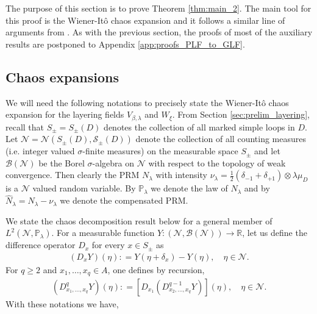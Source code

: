 \documentclass[a4paper, 11pt, reqno]{amsart}
\theoremstyle{definition} \newtheorem{defn}{Definition}[section]
\theoremstyle{remark} \newtheorem{rem}[defn]{Remark}
\theoremstyle{remark} \newtheorem*{rem*}{Remark}
\theoremstyle{plain} \newtheorem{thm}[defn]{Theorem}
\theoremstyle{plain} \newtheorem{lem}[defn]{Lemma}
\theoremstyle{plain} \newtheorem{prop}[defn]{Proposition}
\theoremstyle{plain} \newtheorem{cor}[defn]{Corollary}
\theoremstyle{remark} \newtheorem{exm}[defn]{\textbf{Example}}
\theoremstyle{remark} \newtheorem{exms}[defn]{\textbf{Examples}}
\theoremstyle{remark} \newtheorem*{bl}{}
\numberwithin{equation}{section} %
\newcommand{\mc}{\mathcal}
\newcommand{\R}{\mathbb{R}}
\newcommand{\pr}{\mathbb{P}}
\begin{document}
    The purpose of this section is to prove Theorem \ref{thm:main_2}. The main tool for this proof is the Wiener-It\^{o} chaos expansion and it  follows a similar line of arguments from \cite{cgpr21}. As with the previous section, the proofs of most of the auxiliary results are postponed to Appendix \ref{app:proofs_PLF_to_GLF}. 
	
	\subsection{Chaos expansions}	
	
	We will need the following notations to precisely state the Wiener-It\^{o} chaos expansion for the layering fields $V_{\beta, \lambda}$ and $W_{\xi}$. From Section \ref{sec:prelim_layering}, recall that $S_{\pm} = S_{\pm} (D)$ denotes the collection of all marked simple loops in $D$. Let $\mc{N} = \mc{N}(S_{\pm}(D), \mc{S}_{\pm}(D))$ denote the collection of all counting measures (i.e. integer valued $\sigma$-finite measures) on the measurable space $S_{\pm}$ and let $\mc{B}(\mc{N})$ be the Borel $\sigma$-algebra on $\mc{N}$ with respect to the topology of weak convergence. Then clearly the PRM $N_{\lambda}$ with intensity $\nu_{\lambda} = \frac{1}{2}(\delta_{-1} + \delta_{+1} ) \otimes \lambda \mu_D$ is a $\mc{N}$ valued random variable. By $\pr_{\lambda}$ we denote the law of $N_{\lambda}$ and by $\hat{N}_{\lambda} = N_{\lambda} - \nu_{\lambda}$ we denote the compensated PRM.
 
    We state the chaos decomposition result below for a general member of $L^2(\mc{N}, \pr_{\lambda})$. For a measurable function $Y: (\mc{N}, \mc{B}(\mc{N}))\to \R$, let us define the difference operator $D_x$ for every $x \in S_{\pm}$ as
	\begin{align}
		(D_x Y ) (\eta) : = Y (\eta  + \delta_x) - Y (\eta), \quad \eta \in \mc{N}.
	\end{align}
	For $q \ge 2$ and $x_1, \ldots, x_q \in A$, one defines by recursion,
	\begin{align}
		(D^q_{x_1, \ldots, x_q} Y )(\eta) : =[ D_{x_1}(D^{q-1}_{x_2, \ldots, x_q} Y)] (\eta), \quad \eta \in \mc{N}.
	\end{align}
    With these notations we have,
       
\end{document}

